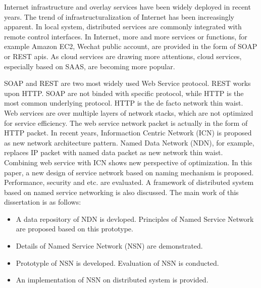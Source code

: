 \begin{eabstract} 
   Internet infrastructure and overlay services have been widely deployed in recent years. The trend of infrastructuralization of Internet has been increasingly apparent. In local system, distributed services are commonly integrated with remote control interfaces. In Internet, more and more services or functions, for example Amazon EC2, Wechat public account, are provided in the form of SOAP or REST apis. As cloud services are drawing more attentions, cloud services, especially based on SAAS, are becoming more popular.

   SOAP and REST are two most widely used Web Service protocol. REST works upon HTTP. SOAP are not binded with specific protocol, while HTTP is the most common underlying protocol. HTTP is the de facto network thin waist. Web services are over multiple layers of network stacks, which are not optimized for service efficiency. The web service network packet is actually in the form of HTTP packet. In recent years, Informaction Centric Network (ICN) is proposed as new network architecture pattern. Named Data Network (NDN), for example, replaces IP packet with named data packet as new network thin waist. Combining web service with ICN shows new perspective of optimization. In this paper, a new design of service network based on naming mechanism is proposed. Performance, security and etc. are evaluated. A framework of distributed system based on named service networking is also discussed. The main work of this dissertation is as follows:

   \begin{itemize}
    \item A data repository of NDN is devloped. Principles of Named Service Network are proposed based on this prototype.
    \item Details of Named Service Network (NSN) are demonstrated.
    \item Prototyple of NSN is developed. Evaluation of NSN is conducted.
    \item An implementation of NSN on distributed system is provided.
  \end{itemize}
   
\end{eabstract}

